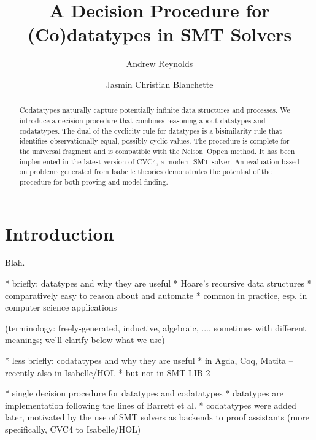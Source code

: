 \documentclass[a4paper,oribibl,envcountsame,draft]{llncs}
\begin{document}
\title{A Decision Procedure for (Co)datatypes in SMT Solvers}

\author {Andrew Reynolds \and Jasmin Christian Blanchette}

\maketitle

\begin{abstract}
Codatatypes naturally capture potentially infinite data structures and
processes. We introduce a decision procedure that combines reasoning about
datatypes and codatatypes. The dual of the cyclicity rule for datatypes is a
bisimilarity rule that identifies observationally equal, possibly cyclic values.
The procedure is complete for the universal fragment and is compatible with the
Nelson--Oppen method. It has been implemented in the latest version of CVC4, a
modern SMT solver. An evaluation based on problems generated from Isabelle
theories demonstrates the potential of the procedure for both proving and model
finding.
\end{abstract}

\setcounter{footnote}{0}

\section{Introduction}
\label{sec:introduction}

Blah.

  * briefly: datatypes and why they are useful
    * Hoare's recursive data structures
    * comparatively easy to reason about and automate
    * common in practice, esp. in computer science applications

    (terminology: freely-generated, inductive, algebraic, ..., sometimes
    with different meanings; we'll clarify below what we use)

  * less briefly: codatatypes and why they are useful
    * in Agda, Coq, Matita -- recently also in Isabelle/HOL \cite{nipkow-et-al-2002}
    * but not in SMT-LIB 2 \cite{barrett-et-al-2010}

  * single decision procedure for datatypes and codatatypes
  * datatypes are implementation following the lines of Barrett et al.
  * codatatypes were added later, motivated by the use of SMT solvers as
    backends to proof assistants (more specifically, CVC4 to Isabelle/HOL)
\end{document}
